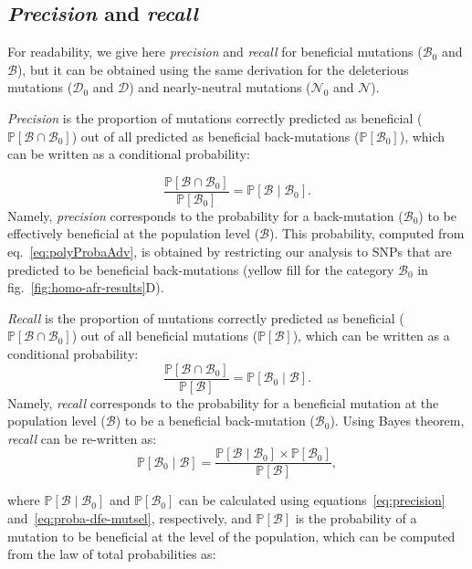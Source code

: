 \documentclass{article}
\newcommand{\proba}{\mathbb{P}}
\newcommand{\SphyDel}{\mathcal{D}_0}
\newcommand{\SphyNeu}{\mathcal{N}_0}
\newcommand{\SphyBen}{\mathcal{B}_0}
\newcommand{\given}{\mid}
\newcommand{\SpopDel}{\mathcal{D}}
\newcommand{\SpopNeu}{\mathcal{N}}
\newcommand{\SpopBen}{\mathcal{B}}
\newcommand{\ProbaPopBen}{\proba [ \SpopBen ]}
\begin{document}
    \subsection{\textit{Precision} and \textit{recall}}
    \label{subsec:precisison_recall}
    For readability, we give here \textit{precision} and \textit{recall} for beneficial mutations ($\SphyBen$ and $\SpopBen$), but it can be obtained using the same derivation for the deleterious mutations ($\SphyDel$ and $\SpopDel$) and nearly-neutral mutations ($\SphyNeu$ and $\SpopNeu$).

    \textit{Precision} is the proportion of mutations correctly predicted as beneficial ($\proba [ \SpopBen \cap  \SphyBen]$) out of all predicted as beneficial back-mutations ($\proba [ \SphyBen]$), which can be written as a conditional probability:

    \begin{equation}
        \frac{\proba [ \SpopBen  \cap  \SphyBen]}{\proba [ \SphyBen]} = \proba [ \SpopBen  \given  \SphyBen].
        \label{eq:precision}
    \end{equation}
    Namely, \textit{precision} corresponds to the probability for a back-mutation ($\SphyBen$) to be effectively beneficial at the population level ($\SpopBen$).
    This probability, computed from eq.~\ref{eq:polyProbaAdv}, is obtained by restricting our analysis to SNPs that are predicted to be beneficial back-mutations (yellow fill for the category $\SphyBen$ in fig.~\ref{fig:homo-afr-results}D).

    \textit{Recall} is the proportion of mutations correctly predicted as beneficial ($\proba [ \SpopBen \cap  \SphyBen]$) out of all beneficial mutations ($\proba [ \SpopBen]$), which can be written as a conditional probability:
    \begin{equation}
        \frac{\proba [ \SpopBen \cap  \SphyBen]}{\proba [ \SpopBen]} = \proba [ \SphyBen  \given \SpopBen ].
    \end{equation}
    Namely, \textit{recall} corresponds to the probability for a beneficial mutation at the population level ($\SpopBen$) to be a beneficial back-mutation ($\SphyBen$).
    Using Bayes theorem, \textit{recall} can be re-written as:
    \begin{equation}
        \proba [\SphyBen \given \SpopBen] = \frac{\proba [\SpopBen \given \SphyBen] \times \proba[\SphyBen]}{\ProbaPopBen},
        \label{eq:bayes}
    \end{equation}

    where $\proba [\SpopBen \given \SphyBen]$ and $\proba [ \SphyBen ]$ can be calculated using equations~\ref{eq:precision} and~\ref{eq:proba-dfe-mutsel}, respectively, and $\proba [ \SpopBen ]$ is the probability of a mutation to be beneficial at the level of the population, which can be computed from the law of total probabilities as:
\end{document}
